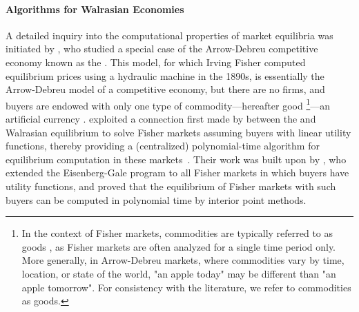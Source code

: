 \paragraph{Algorithms for Walrasian Economies}
A detailed inquiry into the computational properties of market equilibria was initiated by \citet{devanur2008market}, who studied a special case of the Arrow-Debreu competitive economy known as the  \cite{brainard2000compute}.
This model, for which Irving Fisher computed equilibrium prices using a hydraulic machine in the 1890s, is essentially the Arrow-Debreu model of a competitive economy, but there are no firms, and buyers are endowed with only one type of commodity---hereafter good%
\footnote{In the context of Fisher markets, commodities are typically referred to as goods \citep{fisher-tatonnement}, as Fisher markets are often analyzed for a single time period only.
More generally, in Arrow-Debreu markets, where commodities vary by time, location, or state of the world, "an apple today" may be different than "an apple tomorrow". For consistency with the literature, we refer to commodities as goods. }---an artificial currency 
\cite{brainard2000compute, AGT-book}.
\citet{devanur2002market} exploited a connection first made by \citet{eisenberg1961aggregation} between the  and Walrasian equilibrium to solve Fisher markets assuming buyers with linear utility functions, thereby providing a (centralized) polynomial-time algorithm for equilibrium computation in these markets~\cite{devanur2002market,devanur2008market}.
Their work was built upon by \citet{jain2005market}, who extended the Eisenberg-Gale program to all Fisher markets in which buyers have  utility functions, and proved that the equilibrium of Fisher markets with such buyers can be computed in polynomial time by interior point methods. 


